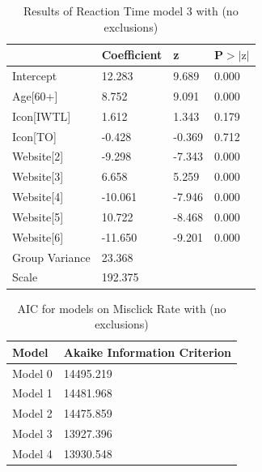 \documentclass[12pt,twoside]{reedthesis}
\begin{document}
\begin{table}[h!]
        \centering
        \begin{tabular}{| p{5cm} | p{2.5cm} | p{2.5cm} | p{2.5cm} |}
            \hline
            & Coefficient & z & P$>|\text{z}|$\\
            \hline
            Intercept & 12.283 & 9.689 & 0.000\\
            \hline
            Age[60+] & 8.752 & 9.091 & 0.000\\
            \hline
            Icon[IWTL] & 1.612 & 1.343 & 0.179\\
            \hline
            Icon[TO] & -0.428 & -0.369 & 0.712\\
            \hline
            Website[2] & -9.298 & -7.343 & 0.000\\
            \hline
            Website[3] & 6.658 & 5.259 & 0.000\\
            \hline
            Website[4] & -10.061 & -7.946 & 0.000\\
            \hline
            Website[5] & 10.722 & -8.468 & 0.000\\
            \hline
            Website[6] & -11.650 & -9.201 & 0.000\\
            \hline
            Group Variance & 23.368 &&\\
            \hline
            Scale & 192.375 &&\\
            \hline
        \end{tabular}
        \caption{Results of Reaction Time model 3 with (no exclusions)}
    \end{table}

\begin{table}[h!]
        \centering
        \begin{tabular}{| p{3.5cm} | p{7.5cm} |}
            \hline
            Model & Akaike Information Criterion\\
            \hline
            Model 0 & 14495.219\\
            \hline
            Model 1 & 14481.968\\
            \hline
            Model 2 & 14475.859\\
            \hline
            Model 3 & 13927.396\\
            \hline
            Model 4 & 13930.548\\
            \hline
        \end{tabular}
        \caption{AIC for models on Misclick Rate with (no exclusions)}
    \end{table}
\end{document}

